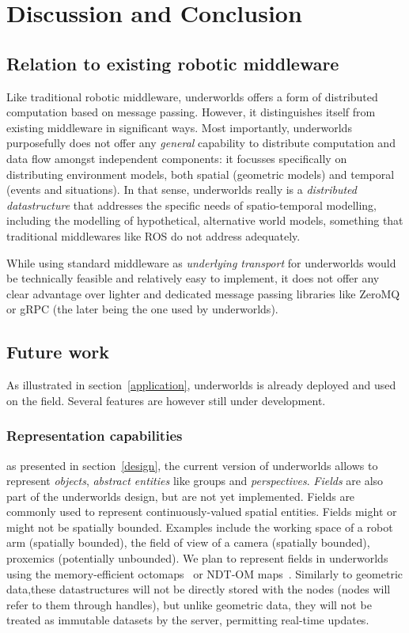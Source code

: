 \documentclass[letterpaper, 10pt, conference]{ieeeconf}
\newcommand{\uwds}{{\sc underworlds}\xspace}
\begin{document}
\section{Discussion and Conclusion}

\subsection{Relation to existing robotic middleware}

Like traditional robotic middleware, \uwds offers a form of distributed
computation based on message passing. However, it distinguishes itself from
existing middleware in significant ways. Most importantly, \uwds purposefully
does not offer any \emph{general} capability to distribute computation and data
flow amongst independent components: it focusses specifically on distributing
environment models, both spatial (geometric models) and temporal (events and
situations). In that sense, \uwds really is a \emph{distributed datastructure}
that addresses the specific needs of spatio-temporal modelling,
including the modelling of hypothetical, alternative world models, something
that traditional middlewares like ROS do not address adequately.

While using standard middleware as \emph{underlying transport} for \uwds would be
technically feasible and relatively easy to implement, it does not offer any
clear advantage over lighter and dedicated message passing libraries like ZeroMQ
or gRPC (the later being the one used by \uwds).

\subsection{Future work}
\label{futurework}

As illustrated in section~\ref{application}, \uwds is already deployed and used
on the field. Several features are however still under development.

\subsubsection{Representation capabilities} as presented in
section~\ref{design}, the current version of \uwds allows to represent
\emph{objects}, \emph{abstract entities} like groups and \emph{perspectives}.
\emph{Fields} are also part of the \uwds design, but are not yet implemented.
Fields are commonly used to represent
continuously-valued spatial entities. Fields might or might not be spatially
bounded. Examples include the working space of a robot arm (spatially bounded),
the field of view of a camera (spatially bounded), proxemics (potentially
unbounded). We plan to represent fields in \uwds using the memory-efficient
octomaps~\cite{hornung2013octomap} or NDT-OM maps~\cite{saarinen20133d}.
Similarly to geometric data,these datastructures
will not be directly stored with the nodes (nodes will refer to them through 
handles), but unlike geometric data, they will not be treated as immutable
datasets by the server, permitting real-time updates.
\end{document}
